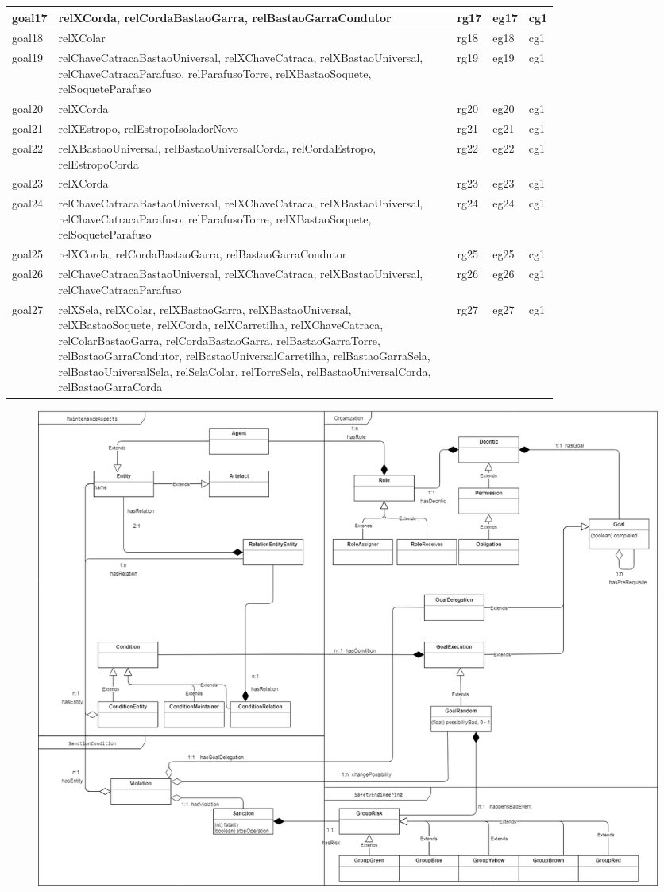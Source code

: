 \documentclass[12pt]{article}
\begin{document}
\begin{table}[H]
\begin{tabular}{|l|p{0.8\linewidth}|l|l|l|}
goal17 & relXCorda, relCordaBastaoGarra, relBastaoGarraCondutor & rg17 & eg17 & cg1 \\ \hline
goal18 & relXColar & rg18 & eg18 & cg1 \\ \hline
goal19 & relChaveCatracaBastaoUniversal, relXChaveCatraca, relXBastaoUniversal, relChaveCatracaParafuso, relParafusoTorre, relXBastaoSoquete, relSoqueteParafuso & rg19 & eg19 & cg1 \\ \hline
goal20 & relXCorda & rg20 & eg20 & cg1 \\ \hline
goal21 & relXEstropo, relEstropoIsoladorNovo & rg21 & eg21 & cg1 \\ \hline
goal22 & relXBastaoUniversal, relBastaoUniversalCorda, relCordaEstropo, relEstropoCorda & rg22 & eg22 & cg1 \\ \hline
goal23 & relXCorda & rg23 & eg23 & cg1 \\ \hline
goal24 & relChaveCatracaBastaoUniversal, relXChaveCatraca, relXBastaoUniversal, relChaveCatracaParafuso, relParafusoTorre, relXBastaoSoquete, relSoqueteParafuso & rg24 & eg24 & cg1 \\ \hline
goal25 & relXCorda, relCordaBastaoGarra, relBastaoGarraCondutor & rg25 & eg25 & cg1 \\ \hline
goal26 & relChaveCatracaBastaoUniversal, relXChaveCatraca, relXBastaoUniversal, relChaveCatracaParafuso & rg26 & eg26 & cg1 \\ \hline
goal27 & relXSela, relXColar, relXBastaoGarra, relXBastaoUniversal, relXBastaoSoquete, relXCorda, relXCarretilha, relXChaveCatraca, relColarBastaoGarra, relCordaBastaoGarra, relBastaoGarraTorre, relBastaoGarraCondutor, relBastaoUniversalCarretilha, relBastaoGarraSela, relBastaoUniversalSela, relSelaColar, relTorreSela, relBastaoUniversalCorda, relBastaoGarraCorda & rg27 & eg27 & cg1 \\ \hline
\end{tabular}
\end{table}


\begin{figure}[H]
  \centering
  \includegraphics[width=0.8\linewidth]{umlmodel} 
\end{figure}




\end{document}
